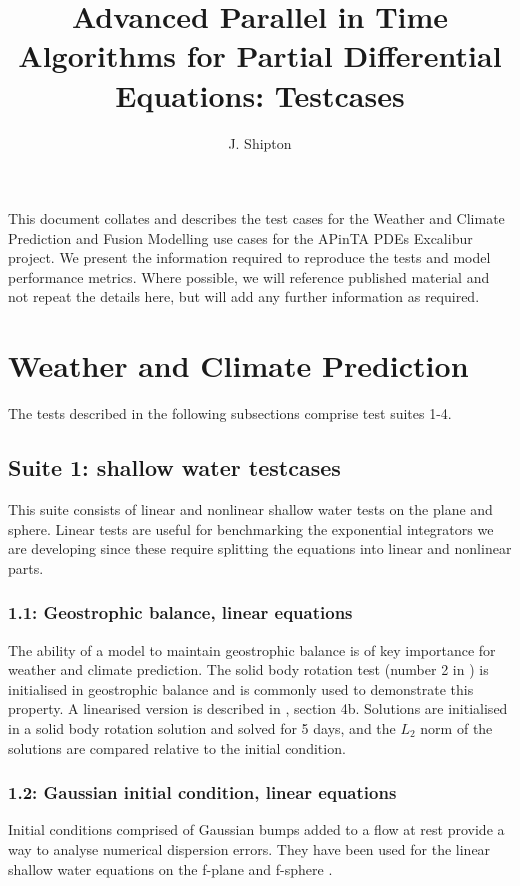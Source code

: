 \documentclass{article}
\title{Advanced Parallel in Time Algorithms for Partial Differential Equations: Testcases}
\author{J. Shipton}
\begin{document}
\maketitle

This document collates and describes the test cases for the Weather
and Climate Prediction and Fusion Modelling use cases for the APinTA
PDEs Excalibur project. We present the information required to
reproduce the tests and model performance metrics. Where possible, we
will reference published material and not repeat the details here, but
will add any further information as required.

\section{Weather and Climate Prediction}

The tests described in the following subsections comprise test suites 1-4.

\subsection{Suite 1: shallow water testcases}
This suite consists of linear and nonlinear shallow water tests on the
plane and sphere. Linear tests are useful for benchmarking the
exponential integrators we are developing since these require
splitting the equations into linear and nonlinear parts.

\subsubsection{1.1: Geostrophic balance, linear equations}
The ability of a model to maintain geostrophic balance is of key
importance for weather and climate prediction. The solid body rotation
test (number 2 in \citet{williamson1992standard}) is initialised in
geostrophic balance and is commonly used to demonstrate this
property. A linearised version is described in
\citet{weller2012computational}, section 4b. Solutions are initialised
in a solid body rotation solution and solved for 5 days, and the $L_2$
norm of the solutions are compared relative to the initial condition.

\subsubsection{1.2: Gaussian initial condition, linear equations}
Initial conditions comprised of Gaussian bumps added to a flow at rest
provide a way to analyse numerical dispersion errors. They have been
used for the linear shallow water equations on the f-plane and
f-sphere \citep{schreiber2018beyond, schreiber2019parallel}.
\end{document}
